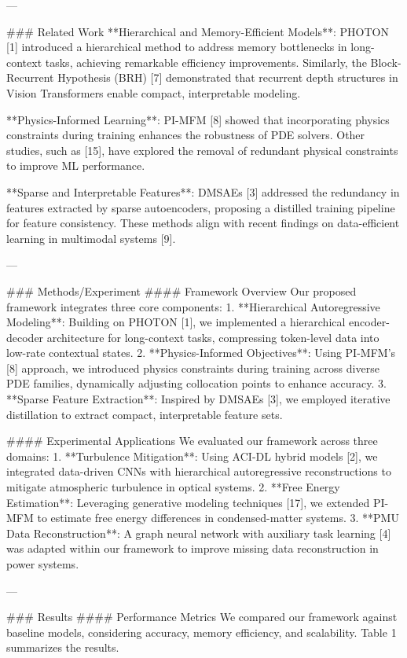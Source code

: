 ---

### Related Work
**Hierarchical and Memory-Efficient Models**: PHOTON [1] introduced a hierarchical method to address memory bottlenecks in long-context tasks, achieving remarkable efficiency improvements. Similarly, the Block-Recurrent Hypothesis (BRH) [7] demonstrated that recurrent depth structures in Vision Transformers enable compact, interpretable modeling.

**Physics-Informed Learning**: PI-MFM [8] showed that incorporating physics constraints during training enhances the robustness of PDE solvers. Other studies, such as [15], have explored the removal of redundant physical constraints to improve ML performance.

**Sparse and Interpretable Features**: DMSAEs [3] addressed the redundancy in features extracted by sparse autoencoders, proposing a distilled training pipeline for feature consistency. These methods align with recent findings on data-efficient learning in multimodal systems [9].

---

### Methods/Experiment
#### Framework Overview
Our proposed framework integrates three core components:
1. **Hierarchical Autoregressive Modeling**: Building on PHOTON [1], we implemented a hierarchical encoder-decoder architecture for long-context tasks, compressing token-level data into low-rate contextual states.
2. **Physics-Informed Objectives**: Using PI-MFM's [8] approach, we introduced physics constraints during training across diverse PDE families, dynamically adjusting collocation points to enhance accuracy.
3. **Sparse Feature Extraction**: Inspired by DMSAEs [3], we employed iterative distillation to extract compact, interpretable feature sets.

#### Experimental Applications
We evaluated our framework across three domains:
1. **Turbulence Mitigation**: Using ACI-DL hybrid models [2], we integrated data-driven CNNs with hierarchical autoregressive reconstructions to mitigate atmospheric turbulence in optical systems.
2. **Free Energy Estimation**: Leveraging generative modeling techniques [17], we extended PI-MFM to estimate free energy differences in condensed-matter systems.
3. **PMU Data Reconstruction**: A graph neural network with auxiliary task learning [4] was adapted within our framework to improve missing data reconstruction in power systems.

---

### Results
#### Performance Metrics
We compared our framework against baseline models, considering accuracy, memory efficiency, and scalability. Table 1 summarizes the results.

